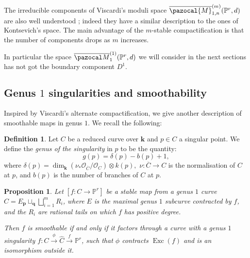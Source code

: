 \documentclass[11pt]{amsart}
\newcommand{\Mone}[3]{\overline{\pazocal M}^{(1)}_{#1}(#2,#3)}
\newcommand{\PP}{\mathbb P}
\renewcommand{\k}{\mathbf k}
\newcommand{\OO}{\mathcal O}
\renewcommand{\to}{\rightarrow}
\theoremstyle{plain}
\newtheorem{prop}[thm]{Proposition}
\newtheorem{cor}[thm]{Corollary}
\theoremstyle{definition}
\newtheorem{dfn}[thm]{Definition}
\begin{document}
The irreducible components of Viscardi's moduli space $\overline{\pazocal{M}}^{(m)}_{1,n}(\PP^r,d)$ are also well understood \cite[Thm.~5.9]{VISC}; indeed they have a similar description to the ones of Kontsevich's space. The main advantage of the $m$-stable compactification is that the number of components drops as $m$ increases.

In particular the space $\Mone{1}{\PP^r}{d}$ we will consider in the next sections has not got the boundary component $D^1$.
 
 \subsection{Genus $1$ singularities and smoothability}
 Inspired by Viscardi's alternate compactification, we give another description of smoothable maps in genus $1.$ We recall the following:
 \begin{dfn}
 Let $C$ be a reduced curve over $\k$ and $p\in C$ a singular point. We define the \emph{genus of the singularity} in $p$ to be the quantity: \[g(p)=\delta(p)-b(p)+1,\] where $\delta(p)=\dim_{\k}(\nu_*\OO_{\overline C}/\OO_C)\otimes k(p),$ $\nu\colon\overline{C}\to C$ is the normalisation of $C$ at $p$, and $b(p)$ is the number of branches of $C$ at $p.$
 \end{dfn}

 \begin{prop}\label{prop:smoothability2}
 Let $[f\colon C\to \PP^r]$ be a stable map from a genus $1$ curve $C=E {}_{\mathbf p}\!\sqcup_{\mathbf q}\bigsqcup_{i=1}^m R_i$, where $E$ is the maximal genus $1$ subcurve contracted by $f$, and the $R_i$ are rational tails on which $f$ has positive degree. 
  
  Then $f$ is smoothable if and only if it factors through a curve with a genus $1$ singularity $f\colon C\xrightarrow{\phi}\widehat C\xrightarrow{\hat f} \PP^r$, such that $\phi$ contracts $\operatorname{Exc}(f)$ and is an isomorphism outside it.
\end{prop}
\end{document}
